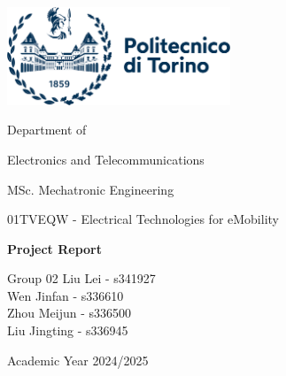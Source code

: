 \documentclass[journal]{IEEEtran}
\begin{document}



\thispagestyle{empty}

\begin{titlepage}
	\begin{center}
		\includegraphics[width=0.5\textwidth]{Figures/logo_polito}
		
		\vspace{1cm}
		
		{\large Department of}
		
		\vspace{0.2cm}
		
		{\Large Electronics and Telecommunications}
		
		\vspace{0.2cm}
		
		{\large MSc. Mechatronic Engineering}
		
		\vfill
		
		{\Large 01TVEQW - Electrical Technologies for eMobility}
		
		\vspace{0.2cm}
		
		
		\vfill
		
		{\LARGE \textbf{Project Report}}
		
		\vspace{0.2cm}
		
		
		\vfill
		{\Large Group 02}
		\vfill
		Liu Lei - s341927\\
		Wen Jinfan - s336610\\
		Zhou Meijun - s336500\\
		Liu Jingting - s336945 \\
		
		\vfill
		
		{\large Academic Year 2024/2025}
	\end{center}
\end{titlepage}
\end{document}
